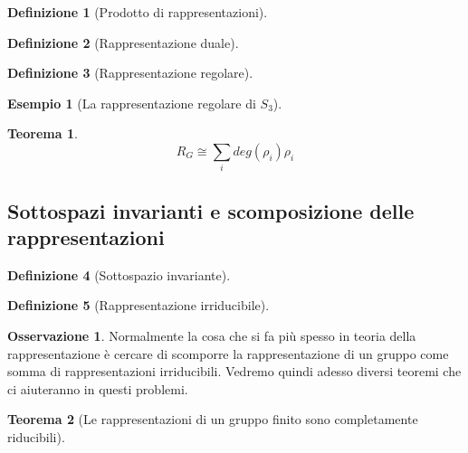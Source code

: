 \documentclass[11pt]{article}
\theoremstyle{plain}
\newtheorem{thm}{Teorema}[section]
\theoremstyle{definition}
\newtheorem{defn}{Definizione}[section]
\newtheorem{exmp}{Esempio}[section]
\newtheorem*{rem}{Osservazione}
\theoremstyle{remark}
\newcommand{\dsum}{\displaystyle\sum}
\begin{document}
\begin{defn}[Prodotto di rappresentazioni]

\label{defn:prodotto di rappresentazioni}
\end{defn}



\begin{defn}[Rappresentazione duale]

\label{defn:rappresentazione duale}
\end{defn}

\begin{defn}[Rappresentazione regolare]

\label{defn:rappresentazione regolare}
\end{defn}

\begin{exmp}[La rappresentazione regolare di $S_3$]


\end{exmp}


\begin{thm}

\[R_G \cong \dsum_i deg(\rho_i) \rho_i \]

\end{thm}



\subsection{Sottospazi invarianti e scomposizione delle rappresentazioni}


\begin{defn}[Sottospazio invariante]

\end{defn}


\begin{defn}[Rappresentazione irriducibile]

\end{defn}

\begin{rem} Normalmente la cosa che si fa più spesso in teoria della rappresentazione è cercare di scomporre la rappresentazione di un gruppo come somma di rappresentazioni irriducibili. Vedremo quindi adesso diversi teoremi che ci aiuteranno in questi problemi.

\end{rem}

\begin{thm}[Le rappresentazioni di un gruppo finito sono completamente riducibili]

\end{thm}
\end{document}

